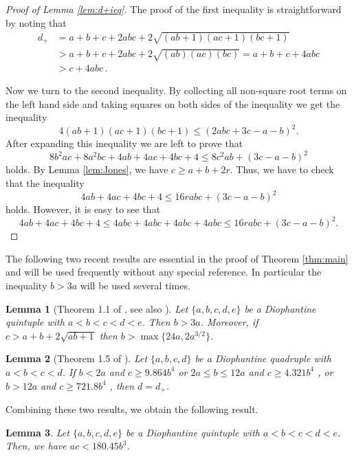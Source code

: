 \documentclass{amsart}
\newtheorem{lemma}{Lemma}
\theoremstyle{definition}
\begin{document}
\begin{proof}[Proof of Lemma \ref{lem:d+ieq}]
 The proof of the first inequality is straightforward by noting that
 \begin{align*}
 d_{+}&=a+b+c + 2abc + 2\sqrt{(ab+1)(ac+1)(bc+1)}\\
 &> a+b+c+2abc+2\sqrt{(ab)(ac)(bc)}=a+b+c+4abc\\
 &>  c+4abc\,.
 \end{align*}
 
 Now we turn to the second inequality. By collecting all non-square root terms on the left hand side and taking squares on both sides of the inequality we get the inequality
 $$4(ab+1)(ac+1)(bc+1)\leq (2abc+3c-a-b)^2.$$
 After expanding this inequality we are left to prove that
 $$8b^2ac+8a^2bc+4ab+4ac+4bc+4\leq 8c^2ab+(3c-a-b)^2$$
 holds. By Lemma \ref{lem:Jones}, we have $c\geq a+b+2r$. Thus, we have to check that the inequality
 $$4ab+4ac+4bc+4\leq 16rabc+(3c-a-b)^2$$
 holds. However, it is easy to see that
 $$4ab+4ac+4bc+4\leq 4abc+4abc+4abc+4abc\leq 16rabc+(3c-a-b)^2.$$
\end{proof}

The following two recent results are essential in the proof of Theorem \ref{thm:main} and will be used frequently without any special reference. In particular
the inequality $b>3a$ will be used several times.

\begin{lemma}[Theorem 1.1 of \cite{Cipu-Filipin-Fujita}, see also \cite{Cipu-Fujita}]\label{lem:b3a}
 Let $\{a,b,c,d,e\}$ be a Diophantine quintuple with $a < b < c < d < e$. Then $b > 3a$. Moreover, if $c > a+b+2\sqrt{ab+1}$ then $b > \max\{24 a, 2 a^{3/2}\}$.
\end{lemma}

\begin{lemma}[Theorem 1.5 of \cite{Fujita-Miyazaki}]\label{lem:cb}
 Let $\{a, b, c, d\}$ be a Diophantine quadruple with $a < b < c < d$. If $b < 2a$ and $c \geq 9.864 b^4$ or $2a \leq b \leq 12a$ and $c \geq 4.321b^4$ , or $b > 12a$ and
$c \geq 721.8b^4$ , then $d = d_+$. 
\end{lemma}

Combining these two results, we obtain the following result.

\begin{lemma}\label{lem:acb}
  Let $\{a,b,c,d,e\}$ be a Diophantine quintuple with $a < b < c < d < e$. Then, we have $ac<180.45 b^3$.  
\end{lemma}
\end{document}
